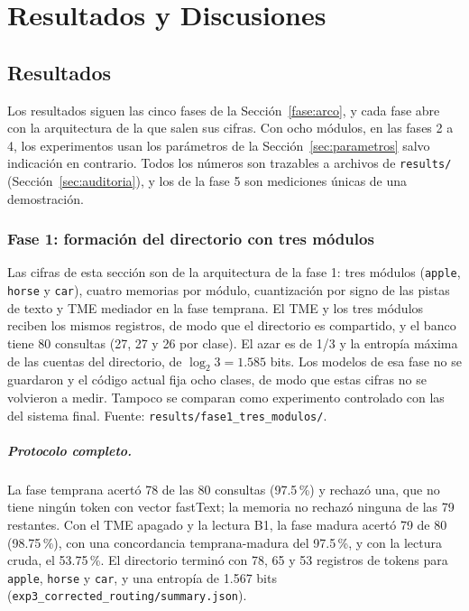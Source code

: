 \chapter{Resultados y Discusiones}\label{cap:resultados}

\section{Resultados}
\label{sec:resultados}
Los resultados siguen las cinco fases de la Sección~\ref{fase:arco}, y cada fase abre
con la arquitectura de la que salen sus cifras.
Con ocho módulos, en las fases 2 a 4, los experimentos usan los parámetros de la
Sección~\ref{sec:parametros} salvo indicación en contrario.
Todos los números son trazables a archivos de \texttt{results/}
(Sección~\ref{sec:auditoria}), y los de la fase 5 son mediciones únicas de una
demostración.

\subsection{Fase 1: formación del directorio con tres módulos}
\label{sec:fase1-resultados}

Las cifras de esta sección son de la arquitectura de la fase 1: tres módulos
(\texttt{apple}, \texttt{horse} y \texttt{car}), cuatro memorias por módulo,
cuantización por signo de las pistas de texto y TME mediador en la fase temprana.
El TME y los tres módulos reciben los mismos registros, de modo que el directorio es
compartido, y el banco tiene 80 consultas (27, 27 y 26 por clase).
El azar es de 1/3 y la entropía máxima de las cuentas del directorio, de
$\log_2 3 = 1.585$ bits.
Los modelos de esa fase no se guardaron y el código actual fija ocho clases, de modo que
estas cifras no se volvieron a medir.
Tampoco se comparan como experimento controlado con las del sistema final.
Fuente: \texttt{results/fase1\_tres\_modulos/}.

\paragraph{Protocolo completo.}
La fase temprana acertó 78 de las 80 consultas (97.5\,\%) y rechazó una, que no tiene
ningún token con vector fastText; la memoria no rechazó ninguna de las 79 restantes.
Con el TME apagado y la lectura B1, la fase madura acertó 79 de 80 (98.75\,\%), con una
concordancia temprana-madura del 97.5\,\%, y con la lectura cruda, el 53.75\,\%.
El directorio terminó con 78, 65 y 53 registros de tokens para \texttt{apple},
\texttt{horse} y \texttt{car}, y una entropía de 1.567 bits
(\texttt{exp3\_corrected\_routing/summary.json}).

